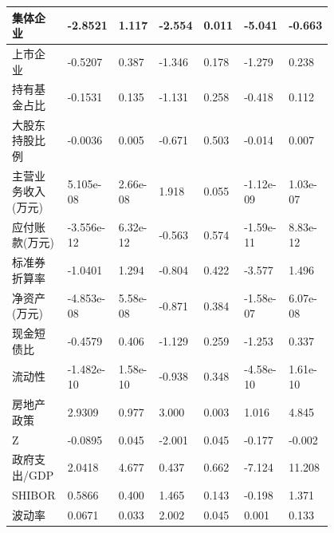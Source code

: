 \begin{table}
\begin{longtable}{p{0.18\linewidth}p{0.1\linewidth}p{0.1\linewidth}p{0.1\linewidth}p{0.1\linewidth}p{0.12\linewidth}p{0.1\linewidth}}
		集体企业           & -2.8521       & 1.117            & -2.554     & 0.011          & -5.041          & -0.663          \\ \hline
		上市企业           & -0.5207       & 0.387            & -1.346     & 0.178          & -1.279          & 0.238           \\ \hline
		持有基金占比       & -0.1531       & 0.135            & -1.131     & 0.258          & -0.418          & 0.112           \\ \hline
		大股东持股比例     & -0.0036       & 0.005            & -0.671     & 0.503          & -0.014          & 0.007           \\ \hline
		主营业务收入(万元) & 5.105e-08     & 2.66e-08         & 1.918      & 0.055          & -1.12e-09       & 1.03e-07        \\ \hline
		应付账款(万元)     & -3.556e-12    & 6.32e-12         & -0.563     & 0.574          & -1.59e-11       & 8.83e-12        \\ \hline
		标准券折算率       & -1.0401       & 1.294            & -0.804     & 0.422          & -3.577          & 1.496           \\ \hline
		净资产(万元)       & -4.853e-08    & 5.58e-08         & -0.871     & 0.384          & -1.58e-07       & 6.07e-08        \\ \hline
		现金短债比         & -0.4579       & 0.406            & -1.129     & 0.259          & -1.253          & 0.337           \\ \hline
		流动性             & -1.482e-10    & 1.58e-10         & -0.938     & 0.348          & -4.58e-10       & 1.61e-10        \\ \hline
		房地产政策         & 2.9309        & 0.977            & 3.000      & 0.003          & 1.016           & 4.845           \\ \hline
		Z                  & -0.0895       & 0.045            & -2.001     & 0.045          & -0.177          & -0.002          \\ \hline
		政府支出/GDP       & 2.0418        & 4.677            & 0.437      & 0.662          & -7.124          & 11.208          \\ \hline
		SHIBOR             & 0.5866        & 0.400            & 1.465      & 0.143          & -0.198          & 1.371           \\ \hline
		波动率             & 0.0671        & 0.033            & 2.002      & 0.045          & 0.001           & 0.133           \\ \hline

\end{longtable}
\end{table}
